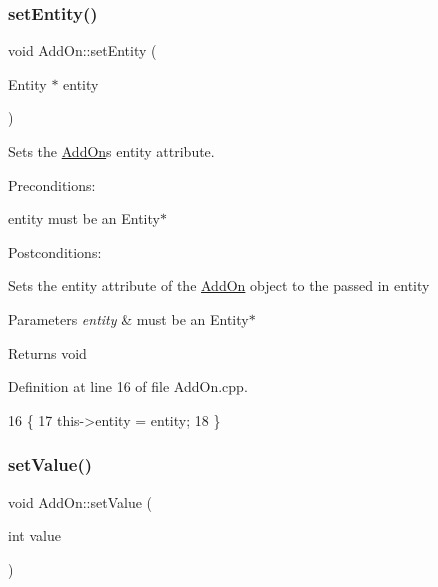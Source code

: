 \subsubsection{\texorpdfstring{set\+Entity()}{setEntity()}}
{\footnotesize\ttfamily void Add\+On\+::set\+Entity (\begin{DoxyParamCaption}\item[{Entity $\ast$}]{entity }\end{DoxyParamCaption})}



Sets the \hyperlink{classAddOn}{Add\+On}\textquotesingle{}s entity attribute. 

Preconditions\+:
\begin{DoxyItemize}
\item entity must be an Entity$\ast$
\end{DoxyItemize}

Postconditions\+:
\begin{DoxyItemize}
\item Sets the entity attribute of the \hyperlink{classAddOn}{Add\+On} object to the passed in entity
\end{DoxyItemize}


\begin{DoxyParams}{Parameters}
{\em entity} & must be an Entity$\ast$ \\
\hline
\end{DoxyParams}
\begin{DoxyReturn}{Returns}
void 
\end{DoxyReturn}


Definition at line 16 of file Add\+On.\+cpp.


\begin{DoxyCode}
16                                     \{
17     this->entity = entity;
18 \}
\end{DoxyCode}
\mbox{\label{classAddOn_a19f4fe81bd1f0491764e52b48a0b3e63}} 
\subsubsection{\texorpdfstring{set\+Value()}{setValue()}}
{\footnotesize\ttfamily void Add\+On\+::set\+Value (\begin{DoxyParamCaption}\item[{int}]{value }\end{DoxyParamCaption})}



